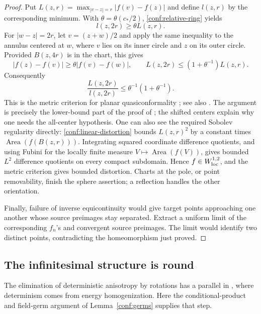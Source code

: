 \documentclass[11pt]{article}
\numberwithin{equation}{section}
\theoremstyle{definition}
\theoremstyle{remark}
\newcommand{\1}{\mathbf 1}
\begin{document}
\begin{proof}
Put \(L(z,r)=\max_{|v-z|=r}|f(v)-f(z)|\) and define
\(l(z,r)\) by the corresponding minimum.  With
\(\theta=\theta(c_*/2)\), \eqref{conf:relative-ring} yields
\[
 l(z,2r)\ge\theta L(z,r).
\]
For \(|w-z|=2r\), let \(v=(z+w)/2\) and apply the same
inequality to the annulus centered at \(w\), where \(v\) lies
on its inner circle and \(z\) on its outer circle.  Provided
\(B(z,4r)\) is in the chart, this gives
\[
 |f(z)-f(v)|\ge\theta|f(v)-f(w)|,
 \qquad
 L(z,2r)\le(1+\theta^{-1})L(z,r).
\]
Consequently
\begin{equation}
 \frac{L(z,2r)}{l(z,2r)}
       \le \theta^{-1}(1+\theta^{-1}).
 \label{conf:linear-distortion}
\end{equation}
This is the metric criterion for planar quasiconformality
\cite[Theorem~1]{Cristea1989Quasiconformality}; see also
\cite[Theorem~2.5.3]{AstalaIwaniecMartin2009}. The
argument is precisely the lower-bound part of the proof of
\cite[Lemma~3.1, equations~(3.3)--(3.7)]{IvriiMarkovic2019}; the
shifted centers explain why one needs the all-center hypothesis.
One can also see the required Sobolev regularity directly:
\eqref{conf:linear-distortion} bounds \(L(z,r)^2\) by a constant
times \(\operatorname{Area}(f(B(z,r)))\).  Integrating squared coordinate
difference quotients, and using Fubini for the locally finite
measure \(V\mapsto\operatorname{Area}(f(V))\), gives bounded \(L^2\)
difference quotients on every compact subdomain.  Hence
\(f\in W^{1,2}_{\rm loc}\), and the metric criterion gives
bounded distortion.  Charts at the pole, or point removability,
finish the sphere assertion; a reflection handles the other
orientation.

Finally, failure of inverse equicontinuity would give target points
approaching one another whose source preimages stay separated.
Extract a uniform limit of the corresponding \(f_n\)'s and
convergent source preimages.  The limit would identify two distinct
points, contradicting the homeomorphism just proved.
\end{proof}

\subsection{The infinitesimal structure is round}
\label{conf:tensor-subsection}

The elimination of deterministic anisotropy by rotations has a parallel
in \cite[Section~4.4]{HoldenYuUniformization}, where determinism comes
from energy homogenization.  Here the conditional-product and field-germ
argument of Lemma~\ref{conf:germs} supplies that step.
\end{document}
